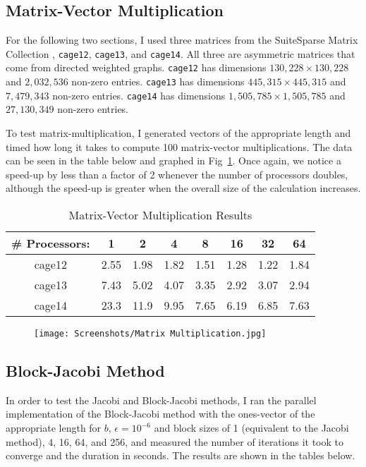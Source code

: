 \documentclass[pageno]{jpaper}
\begin{document}
\begin{doublespacing}
\subsection{Matrix-Vector Multiplication}
For the following two sections, I used three matrices from the SuiteSparse Matrix Collection \cite{davis-sparse-matrix}, \verb|cage12|, \verb|cage13|, and \verb|cage14|. All three are asymmetric matrices that come from directed weighted graphs. \verb|cage12| has dimensions $130,228 \times 130,228$ and $2,032,536$ non-zero entries. \verb|cage13| has dimensions $445,315 \times 445,315$ and $7,479,343$ non-zero entries. \verb|cage14| has dimensions $1,505,785 \times 1,505,785$ and $27,130,349$ non-zero entries.

To test matrix-multiplication, I generated vectors of the appropriate length and timed how long it takes to compute 100 matrix-vector multiplications. The data can be seen in the table below and graphed in Fig~\ref{fig:mat-vec}. Once again, we notice a speed-up by less than a factor of 2 whenever the number of processors doubles, although the speed-up is greater when the overall size of the calculation increases.

\begin{table}[h]
\centering
\begin{tabular}{|c|c|c|c|c|c|c|c|}
\hline
\# Processors: & 1 & 2 & 4 & 8 & 16 & 32 & 64 \\ \hline
cage12 & 2.55 & 1.98 & 1.82 & 1.51 & 1.28 & 1.22 & 1.84 \\ \hline
cage13 & 7.43 & 5.02 & 4.07 & 3.35 & 2.92 & 3.07 & 2.94 \\ \hline
cage14 & 23.3 & 11.9 & 9.95 & 7.65 & 6.19 & 6.85 & 7.63 \\ \hline
\end{tabular}
\label{table:3}
\caption{Matrix-Vector Multiplication Results}
\end{table}

\begin{figure}[h]
\centering
\texttt{[image: Screenshots/Matrix Multiplication.jpg]}
\caption{}
\label{fig:mat-vec}
\end{figure}

\subsection{Block-Jacobi Method}
In order to test the Jacobi and Block-Jacobi methods, I ran the parallel implementation of the Block-Jacobi method with the ones-vector of the appropriate length for $b$, $\epsilon=10^{-6}$ and block sizes of 1 (equivalent to the Jacobi method), 4, 16, 64, and 256, and measured the number of iterations it took to converge and the duration in seconds. The results are shown in the tables below.


\end{doublespacing}
\end{document}
